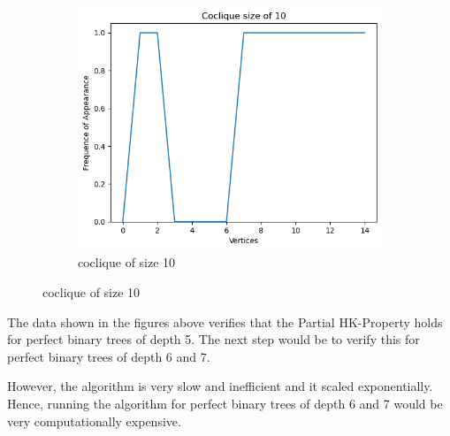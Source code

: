 \documentclass{amsart}
\theoremstyle{definition}
\begin{document}
\begin{appendix}
\begin{figure}[hbt!]
\begin{subfigure}[b]{.45\textwidth}
		\includegraphics[width=1\linewidth]{depth_4_size_10.png}
		\caption{coclique of size 10}
	\end{subfigure}
\end{figure}

The data shown in the figures above verifies that the Partial HK-Property holds for perfect binary trees of depth 5. The next step would be to verify this for perfect binary trees of depth 6 and 7.

However, the algorithm is very slow and inefficient and it scaled exponentially. Hence, running the algorithm for perfect binary trees of depth 6 and 7 would be very computationally expensive.

\end{appendix}

\newpage





\end{document}
